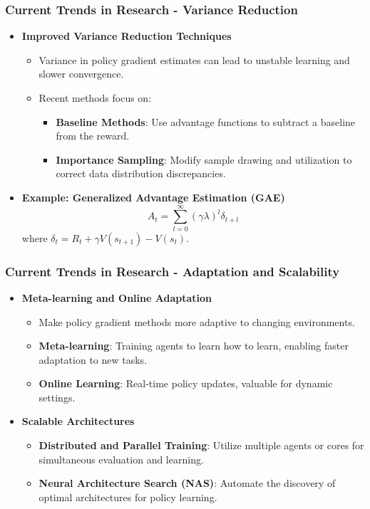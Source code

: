 \documentclass{beamer}
\begin{document}
\begin{frame}[fragile]
    \frametitle{Current Trends in Research - Variance Reduction}
    \begin{itemize}
        \item \textbf{Improved Variance Reduction Techniques}
        \begin{itemize}
            \item Variance in policy gradient estimates can lead to unstable learning and slower convergence.
            \item Recent methods focus on:
                \begin{itemize}
                    \item \textbf{Baseline Methods}: Use advantage functions to subtract a baseline from the reward.
                    \item \textbf{Importance Sampling}: Modify sample drawing and utilization to correct data distribution discrepancies.
                \end{itemize}
        \end{itemize}
        \item \textbf{Example: Generalized Advantage Estimation (GAE)}
        \begin{equation}
            A_t = \sum_{l=0}^{\infty} (\gamma \lambda)^l \delta_{t+l}
        \end{equation}
        where \( \delta_t = R_t + \gamma V(s_{t+1}) - V(s_t) \).
    \end{itemize}
\end{frame}

\begin{frame}[fragile]
    \frametitle{Current Trends in Research - Adaptation and Scalability}
    \begin{itemize}
        \item \textbf{Meta-learning and Online Adaptation}
        \begin{itemize}
            \item Make policy gradient methods more adaptive to changing environments.
            \item \textbf{Meta-learning}: Training agents to learn how to learn, enabling faster adaptation to new tasks.
            \item \textbf{Online Learning}: Real-time policy updates, valuable for dynamic settings.
        \end{itemize}
        \item \textbf{Scalable Architectures}
        \begin{itemize}
            \item \textbf{Distributed and Parallel Training}: Utilize multiple agents or cores for simultaneous evaluation and learning.
            \item \textbf{Neural Architecture Search (NAS)}: Automate the discovery of optimal architectures for policy learning.
        \end{itemize}
    \end{itemize}
\end{frame}
\end{document}
